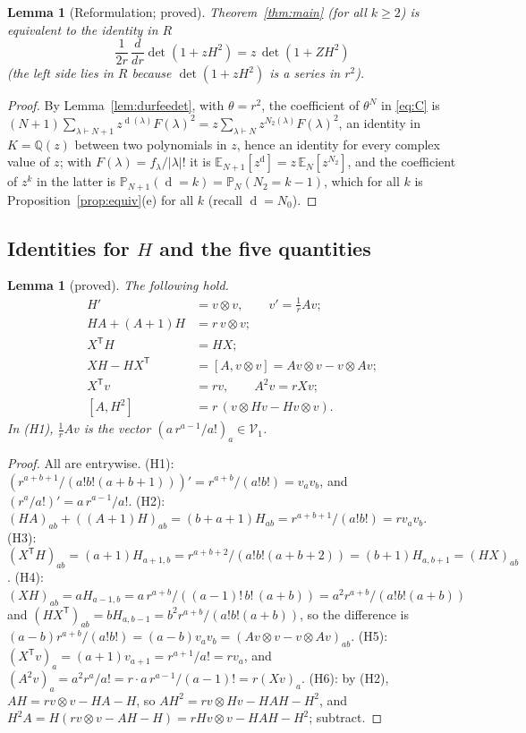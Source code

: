 \documentclass[11pt]{article}
\newtheorem{lemma}[theorem]{Lemma}
\theoremstyle{definition}
\theoremstyle{remark}
\newcommand{\E}{\mathbb{E}}
\newcommand{\Prob}{\mathbb{P}}
\DeclareMathOperator{\Durfee}{d}
\begin{document}
\begin{lemma}[Reformulation; proved]\label{lem:Cprime}
Theorem~\ref{thm:main} (for all $k\ge2$) is equivalent to the identity in $R$
\begin{equation}\label{eq:C}
\frac{1}{2r}\,\frac{d}{dr}\det(1+zH^2)=z\,\det(1+ZH^2)
\end{equation}
(the left side lies in $R$ because $\det(1+zH^2)$ is a series in $r^2$).
\end{lemma}

\begin{proof}
By Lemma~\ref{lem:durfeedet}, with $\theta=r^2$, the coefficient of $\theta^N$ in \eqref{eq:C} is $(N+1)\sum_{\lambda\vdash N+1}z^{\Durfee(\lambda)}F(\lambda)^2=z\sum_{\lambda\vdash N}z^{N_2(\lambda)}F(\lambda)^2$, an identity in $K=\mathbb Q(z)$ between two polynomials in $z$, hence an identity for every complex value of $z$; with $F(\lambda)=f_\lambda/|\lambda|!$ it is $\E_{N+1}[z^{\Durfee}]=z\,\E_N[z^{N_2}]$, and the coefficient of $z^k$ in the latter is $\Prob_{N+1}(\Durfee=k)=\Prob_N(N_2=k-1)$, which for all $k$ is Proposition~\ref{prop:equiv}(e) for all $k$ (recall $\Durfee=N_0$).
\end{proof}

\subsection{Identities for $H$ and the five quantities}

\begin{lemma}[proved]\label{lem:Hids}
The following hold.
\begin{align}
H'&=v\otimes v,\qquad v'=\tfrac1rAv;\tag{H1}\label{eq:H1}\\
HA+(A+1)H&=r\,v\otimes v;\tag{H2}\label{eq:H2}\\
X^{\mathsf T}H&=HX;\tag{H3}\label{eq:H3}\\
XH-HX^{\mathsf T}&=[A,v\otimes v]=Av\otimes v-v\otimes Av;\tag{H4}\label{eq:H4}\\
X^{\mathsf T}v&=rv,\qquad A^2v=rXv;\tag{H5}\label{eq:H5}\\
[A,H^2]&=r\,(v\otimes Hv-Hv\otimes v).\tag{H6}\label{eq:H6}
\end{align}
In (H1), $\frac1rAv$ is the vector $(a\,r^{a-1}/a!)_a\in\mathcal V_1$.
\end{lemma}

\begin{proof}
All are entrywise. (H1): $(r^{a+b+1}/(a!b!(a+b+1)))'=r^{a+b}/(a!b!)=v_av_b$, and $(r^a/a!)'=a\,r^{a-1}/a!$. (H2): $(HA)_{ab}+((A+1)H)_{ab}=(b+a+1)H_{ab}=r^{a+b+1}/(a!b!)=rv_av_b$. (H3): $(X^{\mathsf T}H)_{ab}=(a+1)H_{a+1,b}=r^{a+b+2}/(a!b!(a+b+2))=(b+1)H_{a,b+1}=(HX)_{ab}$. (H4): $(XH)_{ab}=aH_{a-1,b}=a\,r^{a+b}/((a-1)!\,b!\,(a+b))=a^2r^{a+b}/(a!b!(a+b))$ and $(HX^{\mathsf T})_{ab}=bH_{a,b-1}=b^2r^{a+b}/(a!b!(a+b))$, so the difference is $(a-b)r^{a+b}/(a!b!)=(a-b)v_av_b=(Av\otimes v-v\otimes Av)_{ab}$. (H5): $(X^{\mathsf T}v)_a=(a+1)v_{a+1}=r^{a+1}/a!=rv_a$, and $(A^2v)_a=a^2r^a/a!=r\cdot a\,r^{a-1}/(a-1)!=r(Xv)_a$. (H6): by (H2), $AH=rv\otimes v-HA-H$, so $AH^2=rv\otimes Hv-HAH-H^2$, and $H^2A=H(rv\otimes v-AH-H)=rHv\otimes v-HAH-H^2$; subtract.
\end{proof}
\end{document}
